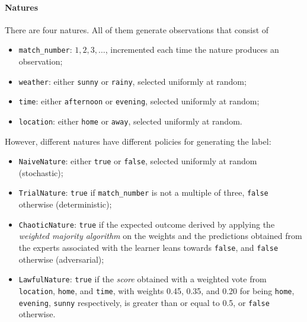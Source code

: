 \documentclass{article}
\begin{document}
\paragraph{Natures} There are four natures. All of them generate observations that consist of 
\begin{itemize}\itemsep-2pt
	\item {\tt match\_number}: $1, 2, 3, \dots$, incremented each time the nature produces an observation; 
	\item {\tt weather}: either {\tt sunny} or {\tt rainy}, selected uniformly at random; 
	\item {\tt time}: either {\tt afternoon} or {\tt evening}, selected uniformly at random;
	\item {\tt location}: either {\tt home} or {\tt away}, selected uniformly at random.
\end{itemize}
However, different natures have different policies for generating the label: 
\begin{itemize}\itemsep-1pt
	\item {\tt NaiveNature}: either {\tt true} or {\tt false}, selected uniformly at random (stochastic); 
	\item {\tt TrialNature}: {\tt true} if {\tt match\_number} is not a multiple of three, {\tt false} otherwise (deterministic); 
	\item {\tt ChaoticNature}: {\tt true} if the expected outcome derived by applying the \emph{weighted 
		majority algorithm} on the weights and the predictions obtained from the experts associated 
		with the learner leans towards {\tt false}, and {\tt false} otherwise (adversarial); 
	\item {\tt LawfulNature}: {\tt true} if the {\it score} obtained with a weighted vote from {\tt location}, 
		{\tt home}, and {\tt time}, with weights 0.45, 0.35, and 0.20 for being {\tt home}, {\tt evening}, {\tt sunny} respectively, 
		is greater than or equal to 0.5, or {\tt false} otherwise. 
\end{itemize}
\end{document}
